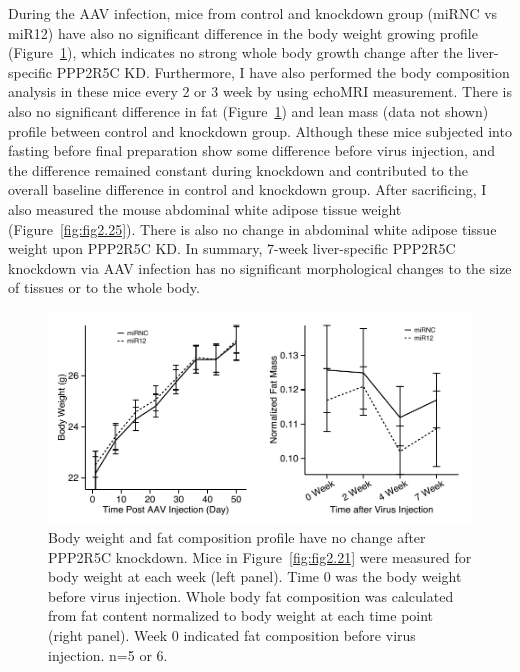 During the \gls{AAV} infection, mice from control and knockdown group (miRNC vs miR12) have also no significant difference in the body weight growing profile (Figure~\ref{fig:fig2.22}), which indicates no strong whole body growth change after the liver-specific PPP2R5C KD. Furthermore, I have also performed the body composition analysis  in these mice every 2 or 3 week by using echoMRI measurement. There is also no significant difference in fat (Figure~\ref{fig:fig2.22}) and lean mass (data not shown) profile between control and knockdown group. Although these mice subjected into fasting before final preparation show some difference before virus injection, and the difference remained constant during knockdown and contributed to the overall baseline difference in control and knockdown group. After sacrificing, I also measured the mouse abdominal white adipose tissue weight (Figure~\ref{fig:fig2.25}). There is also no change in abdominal white adipose tissue weight upon PPP2R5C KD. In summary, 7-week liver-specific PPP2R5C knockdown via \gls{AAV} infection has no significant morphological changes to the size of tissues or to the whole body.

\begin{figure}[htbp]
\centering
\includegraphics[width=1\textwidth]{figs/fig2-22 body weight and echoMRI fat.pdf}
\caption[Body weight and fat composition change after PPP2R5C KD]{\footnotesize Body weight and fat composition profile have no change after PPP2R5C knockdown. Mice in Figure~\ref{fig:fig2.21} were measured for body weight at each week (left panel). Time 0 was the body weight before virus injection. Whole body fat composition was calculated from fat content normalized to body weight at each time point (right panel). Week 0 indicated fat composition before virus injection. n=5 or 6.}
\label{fig:fig2.22}
\end{figure}

